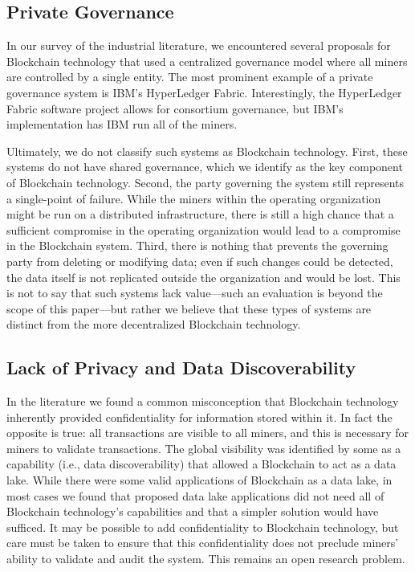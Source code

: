 \subsection{Private Governance}
\label{sec:private-blockchain}
In our survey of the industrial literature, we encountered several proposals for Blockchain technology that used a centralized governance model where all miners are controlled by a single entity.
The most prominent example of a private governance system is IBM's HyperLedger Fabric.
Interestingly, the HyperLedger Fabric software project allows for consortium governance, but IBM's implementation has IBM run all of the miners.

Ultimately, we do not classify such systems as Blockchain technology.
First, these systems do not have shared governance, which we identify as the key component of Blockchain technology.
Second, the party governing the system still represents a single-point of failure.
While the miners within the operating organization might be run on a distributed infrastructure, there is still a high chance that a sufficient compromise in the operating organization would lead to a compromise in the Blockchain system.
Third, there is nothing that prevents the governing party from deleting or modifying data; even if such changes could be detected, the data itself is not replicated outside the organization and would be lost.
This is not to say that such systems lack value---such an evaluation is beyond the scope of this paper---but rather we believe that these types of systems are distinct from the more decentralized Blockchain technology.

\subsection{Lack of Privacy and Data Discoverability}
In the literature we found a common misconception that Blockchain technology inherently provided confidentiality for information stored within it.
In fact the opposite is true: all transactions are visible to all miners, and this is necessary for miners to validate transactions.
The global visibility was identified by some as a capability (i.e., data discoverability) that allowed a Blockchain to act as a data lake.
While there were some valid applications of Blockchain as a data lake, in most cases we found that proposed data lake applications did not need all of Blockchain technology's capabilities and that a simpler solution would have sufficed.
It may be possible to add confidentiality to Blockchain technology, but care must be taken to ensure that this confidentiality does not preclude miners' ability to validate and audit the system.
This remains an open research problem.

